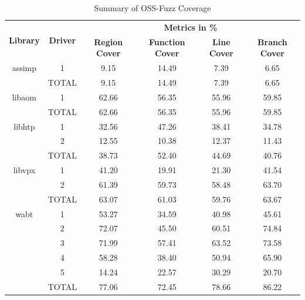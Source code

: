 \documentclass[a4paper,11pt,oneside]{report}
\begin{document}
\begin{table}[h]
  \centering
  \caption{Summary of OSS-Fuzz Coverage}
  \label{tab:coverage_ossfuzz}
  \begin{tabular}{|c|c|c|c|c|c|}
    \hline
    \multirow{2}{*}{\textbf{Library}} & \multirow{2}{*}{\textbf{Driver}} & \multicolumn{4}{c|}{\textbf{Metrics in \%}} \\
    \cline{3-6}
     &  & \textbf{Region Cover} & \textbf{Function Cover} & \textbf{Line Cover} & \textbf{Branch Cover}\\
    \hline
    \multirow{1}{*}{assimp} & 1 & 9.15 & 14.49 & 7.39 & 6.65  \\
     \hline
     & TOTAL & 9.15 & 14.49 & 7.39 & 6.65  \\
    \hline
    \multirow{1}{*}{libaom} & 1 & 62.66 & 56.35 & 55.96 & 59.85 \\
     \hline
     & TOTAL & 62.66 & 56.35 & 55.96 & 59.85  \\
    \hline
    \multirow{1}{*}{libhtp} & 1 & 32.56 & 47.26 & 38.41 & 34.78 \\
     & 2 & 12.55 & 10.38 & 12.37 & 11.43 \\
     \hline
     & TOTAL & 38.73 & 52.40 & 44.69 & 40.76  \\
    \hline
    \multirow{1}{*}{libvpx} & 1 & 41.20 & 19.91 & 21.30 & 41.54 \\
     & 2 & 61.39 & 59.73 & 58.48 & 63.70 \\
     \hline
     & TOTAL & 63.07 & 61.03 & 59.76 & 63.67 \\
    \hline
    \multirow{1}{*}{wabt} & 1 & 53.27 & 34.59 & 40.98 & 45.61 \\
     & 2 & 72.07 & 45.50 & 60.51 & 74.84 \\
     & 3 & 71.99 & 57.41 & 63.52 & 73.58 \\
     & 4 & 58.28 & 38.40 & 50.94 & 65.90 \\
     & 5 & 14.24 & 22.57 & 30.29 & 20.70 \\
     \hline
     & TOTAL & 77.06 & 72.45 & 78.66 & 86.22  \\
    \hline
  \end{tabular}
\end{table}
\end{document}
